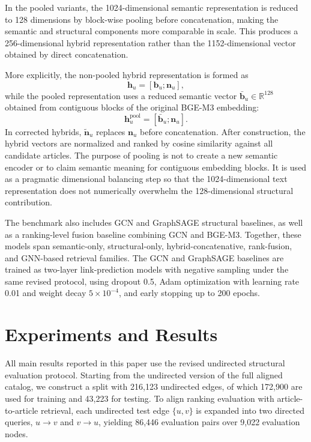 \documentclass[runningheads]{llncs}
\begin{document}
In the pooled variants, the 1024-dimensional semantic representation is reduced
to 128 dimensions by block-wise pooling before concatenation, making the
semantic and structural components more comparable in scale. This produces a
256-dimensional hybrid representation rather than the 1152-dimensional vector
obtained by direct concatenation.

More explicitly, the non-pooled hybrid representation is formed as
\begin{equation}
\mathbf{h}_u = [\mathbf{b}_u ; \mathbf{n}_u],
\end{equation}
while the pooled representation uses a reduced semantic vector
$\bar{\mathbf{b}}_u \in \mathbb{R}^{128}$ obtained from contiguous blocks of the
original BGE-M3 embedding:
\begin{equation}
\mathbf{h}^{\mathrm{pool}}_u = [\bar{\mathbf{b}}_u ; \mathbf{n}_u].
\end{equation}
In corrected hybrids, $\tilde{\mathbf{n}}_u$ replaces $\mathbf{n}_u$ before
concatenation. After construction, the hybrid vectors are normalized and
ranked by cosine similarity against all candidate articles. The purpose of
pooling is not to create a new semantic encoder or to claim semantic meaning
for contiguous embedding blocks. It is used as a pragmatic dimensional
balancing step so that the 1024-dimensional text representation does not
numerically overwhelm the 128-dimensional structural contribution.

The benchmark also includes GCN and GraphSAGE structural baselines, as well as
a ranking-level fusion baseline combining GCN and BGE-M3. Together, these
models span semantic-only, structural-only, hybrid-concatenative, rank-fusion,
and GNN-based retrieval families. The GCN and GraphSAGE baselines are trained
as two-layer link-prediction models with negative sampling under the same
revised protocol, using dropout 0.5, Adam optimization with learning rate 0.01
and weight decay $5\times 10^{-4}$, and early stopping up to 200 epochs.

\section{Experiments and Results}


All main results reported in this paper use the revised undirected structural
evaluation protocol. Starting from the undirected version of the full aligned catalog,
we construct a split with 216,123 undirected edges, of which 172,900 are used
for training and 43,223 for testing. To align ranking evaluation with
article-to-article retrieval, each undirected test edge $\{u,v\}$ is expanded
into two directed queries, $u\rightarrow v$ and $v\rightarrow u$, yielding
86,446 evaluation pairs over 9,022 evaluation nodes.
\end{document}
